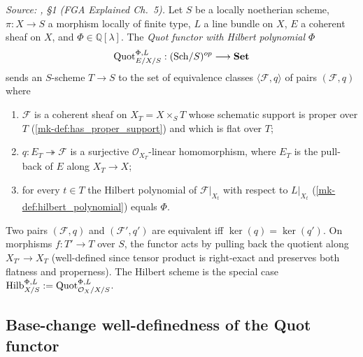 \begin{definition}\label{mk-def:quot_functor}
  \leanok

  \textit{Source: \cite{nitsure-hilbert-quot}, \S 1 (FGA Explained Ch.~5).}
  Let \(S\) be a locally noetherian scheme, \(\pi : X \to S\) a morphism
  locally of finite type,
  \(L\) a line bundle on \(X\), \(E\) a coherent sheaf on \(X\), and
  \(\Phi \in \mathbb{Q}[\lambda]\). The \emph{Quot functor with Hilbert
  polynomial \(\Phi\)}
  \[
    \operatorname{Quot}^{\Phi,L}_{E/X/S} : (\mathrm{Sch}/S)^{op} \longrightarrow \mathbf{Set}
  \]
  sends an \(S\)-scheme \(T \to S\) to the set of equivalence classes
  \(\langle \mathcal{F}, q\rangle\) of pairs \((\mathcal{F}, q)\) where
  \begin{enumerate}
    \item \(\mathcal{F}\) is a coherent sheaf on \(X_T = X \times_S T\) whose
      schematic support is proper over \(T\) (\ref{mk-def:has_proper_support}) and
      which is flat over \(T\);
    \item \(q : E_T \twoheadrightarrow \mathcal{F}\) is a surjective
      \(\mathcal{O}_{X_T}\)-linear homomorphism, where \(E_T\) is the pull-back
      of \(E\) along \(X_T \to X\);
    \item for every \(t \in T\) the Hilbert polynomial of \(\mathcal{F}|_{X_t}\)
      with respect to \(L|_{X_t}\) (\ref{mk-def:hilbert_polynomial}) equals
      \(\Phi\).
  \end{enumerate}
  Two pairs \((\mathcal{F}, q)\) and \((\mathcal{F}', q')\) are equivalent iff
  \(\ker(q) = \ker(q')\). On morphisms \(f : T' \to T\) over \(S\), the functor
  acts by pulling back the quotient along \(X_{T'} \to X_T\) (well-defined
  since tensor product is right-exact and preserves both flatness and
  properness). The Hilbert scheme is the special case
  \(\operatorname{Hilb}^{\Phi,L}_{X/S} := \operatorname{Quot}^{\Phi,L}_{\mathcal{O}_X/X/S}\).
\end{definition}

\subsection{Base-change well-definedness of the Quot functor}
\label{mk-sec:quot_base_change}

